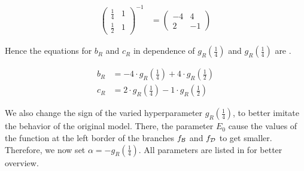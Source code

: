\begin{align}
	\begin{pmatrix}
		\frac{1}{4} & 1 \\
		\frac{1}{2} & 1
	\end{pmatrix}^{-1} & =
	\begin{pmatrix}
		-4 & 4  \\
		2  & -1
	\end{pmatrix}
	\label{equ:setup.quad.hybrid.matrix}
\end{align}

Hence the equations for $b_R$ and $c_R$ in dependence of $g_R\left(\frac{1}{4}\right)$ and $g_R\left(\frac{1}{4}\right)$ are .

\begin{align}
	b_R & = -4 \cdot g_R\left(\frac{1}{4}\right) + 4 \cdot g_R\left(\frac{1}{2}\right) \label{equ:setup.quad.hybrid.bR} \\
	c_R & = 2 \cdot g_R\left(\frac{1}{4}\right) - 1 \cdot g_R\left(\frac{1}{2}\right) \label{equ:setup.quad.hybrid.cR}
\end{align}

We also change the sign of the varied hyperparameter $g_R\left(\frac{1}{4}\right)$, to better imitate the behavior of the original model.
There, the parameter $E_0$ cause the values of the function at the left border of the branches $f_{\mathcal{B}}$ and $f_{\mathcal{D}}$ to get smaller.
Therefore, we now set $\alpha = -g_R\left(\frac{1}{4}\right)$.
All parameters are listed in  for better overview.

